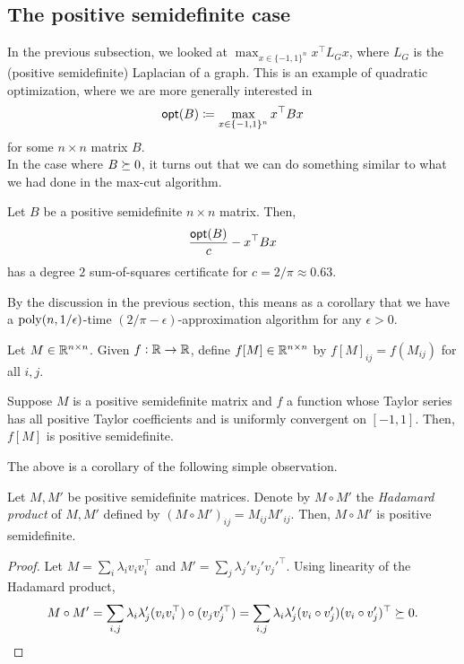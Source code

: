 \subsection{The positive semidefinite case}

	In the previous subsection, we looked at $\max_{x \in \{-1,1\}^n} x^\top L_G x$, where $L_G$ is the (positive semidefinite) Laplacian of a graph. This is an example of quadratic optimization, where we are more generally interested in
	\[ \mathsf{opt}(B) \coloneqq \max_{x \in \{-1,1\}^n} x^\top B x \]
	for some $n \times n$ matrix $B$.\\
	In the case where $B \succeq 0$, it turns out that we can do something similar to what we had done in the max-cut algorithm.

	\begin{ftheo}[Nesterov]
		\label{thm: nesterov}
		Let $B$ be a positive semidefinite $n\times n$ matrix. Then,
		\[ \frac{\mathsf{opt}(B)}{c} - x^\top B x \]
		has a degree $2$ sum-of-squares certificate for $c = 2/\pi \approx 0.63$.
	\end{ftheo}
	By the discussion in the previous section, this means as a corollary that we have a $\operatorname{poly}(n,1/\epsilon)$-time $(2/\pi-\epsilon)$-approximation algorithm for any $\epsilon > 0$.

	\begin{definition}
		Let $M \in \mathbb{R}^{n \times n}$. Given $f : \mathbb{R} \to \mathbb{R}$, define $f[M] \in \mathbb{R}^{n \times n}$ by $f[M]_{ij} = f(M_{ij})$ for all $i,j$.
	\end{definition}

	\begin{fprop}
		\label{prop: taylor-fM-psd}
		Suppose $M$ is a positive semidefinite matrix and $f$ a function whose Taylor series has all positive Taylor coefficients and is uniformly convergent on $[-1,1]$. Then, $f[M]$ is positive semidefinite.
	\end{fprop}

	The above is a corollary of the following simple observation.

	\begin{prop}
		\label{schur-prod-thm}
		Let $M,M'$ be positive semidefinite matrices. Denote by $M \circ M'$ the \emph{Hadamard product} of $M,M'$ defined by $(M\circ M')_{ij} = M_{ij} M'_{ij}$. Then, $M \circ M'$ is positive semidefinite.
	\end{prop}
	\begin{proof}
		Let $M = \sum_i \lambda_i v_i v_i^\top$ and $M' = \sum_j \lambda_j' v_j'v_j'^\top$. Using linearity of the Hadamard product,
		\[ M \circ M' = \sum_{i,j} \lambda_i \lambda'_j (v_i v_i^\top) \circ (v_j v_j'^\top) = \sum_{i,j} \lambda_i \lambda'_j (v_i \circ v_j') (v_i \circ v_j')^\top \succeq 0. \qedhere \]
	\end{proof}

